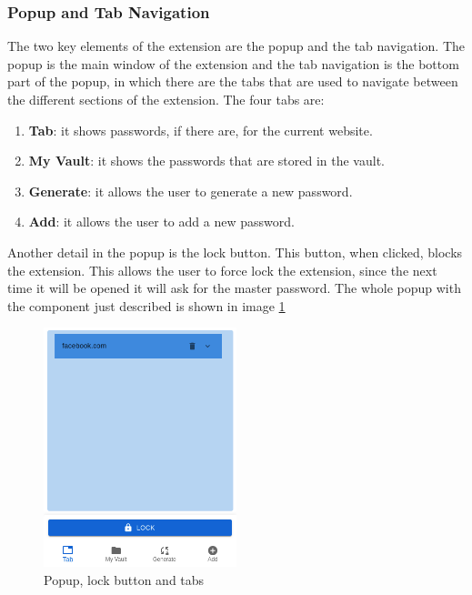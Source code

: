 \subsubsection {Popup and Tab Navigation}

The two key elements of the extension are the popup and the tab navigation. The popup is the main window of the extension and the tab navigation is the bottom part of the popup, in which there are the tabs that are used to navigate between the different sections of the extension. The four tabs are:

\begin{enumerate}
    \item \textbf{Tab}: it shows passwords, if there are, for the current website.
    \item \textbf{My Vault}: it shows the passwords that are stored in the vault.
    \item \textbf{Generate}: it allows the user to generate a new password.
    \item \textbf{Add}: it allows the user to add a new password.
\end{enumerate}


Another detail in the popup is the lock button. This button, when clicked, blocks the extension. This allows the user to force lock the extension, since the next time it will be opened it will ask for the master password.
The whole popup with the component just described is shown in image \ref*{fig:popup-lock-tab}

\begin{figure}[h!]
    \centering
    \vspace{0.5cm}
    \includegraphics[width=0.5\textwidth]{images/extension/popup-lock-tab.png}
    \caption{Popup, lock button and tabs}
    \label{fig:popup-lock-tab} %
\end{figure}

